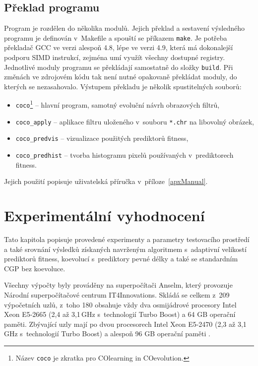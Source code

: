 \section{Překlad programu}

Program je rozdělen do několika modulů. Jejich překlad a sestavení výsledného programu je definován v~Makefile a spouští se příkazem \texttt{make}. Je potřeba překladač GCC ve verzi alespoň 4.8, lépe ve verzi 4.9, která má dokonalejší podporu SIMD instrukcí, zejména umí využít všechny dostupné registry. Jednotlivé moduly programu se překládají samostatně do složky \texttt{build}. Při změnách ve zdrojovém kódu tak není nutné opakovaně překládat moduly, do kterých se nezasahovalo. Výstupem překladu je několik spustitelných souborů:

\begin{itemize}
    \item \texttt{coco}\footnote{Název \texttt{coco} je zkratka pro COlearning in COevolution.} -- hlavní program, samotný evoluční návrh obrazových filtrů,
    \item \texttt{coco\_apply} -- aplikace filtru uloženého v~souboru \texttt{*.chr} na libovolný obrázek,
    \item \texttt{coco\_predvis} -- vizualizace použitých prediktorů fitness,
    \item \texttt{coco\_predhist} -- tvorba histogramu pixelů používaných v~prediktorech fitness.
\end{itemize}

Jejich použití popisuje uživatelská příručka v~příloze~\ref{apxManual}.

\chapter{Experimentální vyhodnocení}
\label{chExperiments}

Tato kapitola popisuje provedené experimenty a parametry testovacího prostředí a také srovnání výsledků získaných navrženým algoritmem s~adaptivní velikostí prediktorů fitness, koevolucí s~prediktory pevné délky a také se standardním CGP bez koevoluce.

Všechny výpočty byly prováděny na superpočítači Anselm, který provozuje Národní superpočítačové centrum IT4Innovations. Skládá se celkem z~209 výpočetních uzlů, z~toho 180 obsahuje vždy dva osmijádrové procesory Intel Xeon E5-2665 (2,4 až 3,1\,GHz s~technologií Turbo Boost) a 64 GB operační paměti. Zbývající uzly mají po dvou procesorech Intel Xeon E5-2470 (2,3 až 3,1\,GHz s~technologií Turbo Boost) a alespoň 96 GB operační paměti \cite{AnselmSpecs}.

